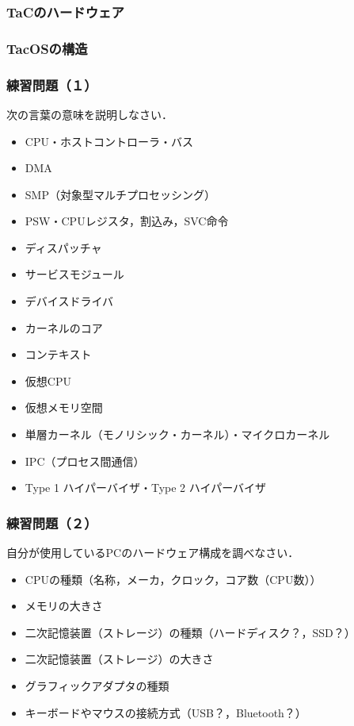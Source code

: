 \documentclass[unicode]{beamer}                   %
\begin{document}
\begin{frame}
  \frametitle{TaCのハードウェア}
\end{frame}

\begin{frame}
  \frametitle{TacOSの構造}
\end{frame}

\begin{frame}
  \frametitle{練習問題（１）}
  次の言葉の意味を説明しなさい．
  \begin{itemize}
  \item CPU・ホストコントローラ・バス
  \item DMA
  \item SMP（対象型マルチプロセッシング）
  \item PSW・CPUレジスタ，割込み，SVC命令
  \item ディスパッチャ
  \item サービスモジュール
  \item デバイスドライバ
  \item カーネルのコア
  \item コンテキスト
  \item 仮想CPU
  \item 仮想メモリ空間
  \item 単層カーネル（モノリシック・カーネル）・マイクロカーネル
  \item IPC（プロセス間通信）
  \item Type 1 ハイパーバイザ・Type 2 ハイパーバイザ
  \end{itemize}
  \vfill
\end{frame}

\begin{frame}
  \frametitle{練習問題（２）}
  自分が使用しているPCのハードウェア構成を調べなさい．
  \begin{itemize}
  \item CPUの種類（名称，メーカ，クロック，コア数（CPU数））
  \item メモリの大きさ
  \item 二次記憶装置（ストレージ）の種類（ハードディスク？，SSD？）
  \item 二次記憶装置（ストレージ）の大きさ
  \item グラフィックアダプタの種類
  \item キーボードやマウスの接続方式（USB？，Bluetooth？）
  \end{itemize}
  \vfill
\end{frame}
\end{document}
